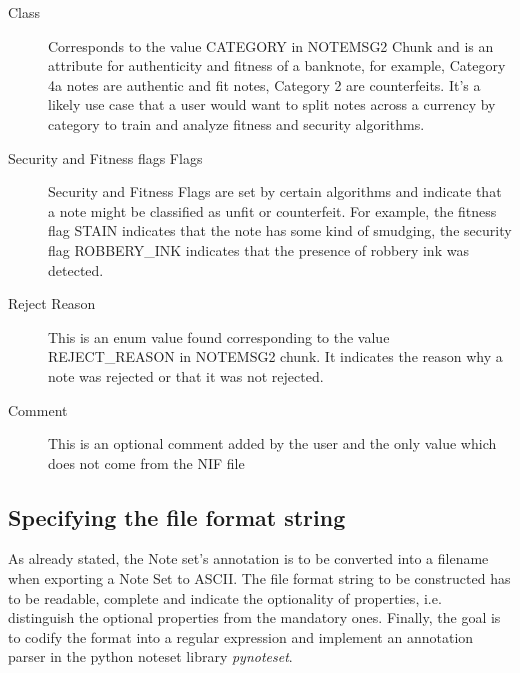 \begin{description}
\item[Class] Corresponds to the value CATEGORY in NOTEMSG2 Chunk and is an attribute for authenticity and fitness of a banknote, for example, Category 4a notes are authentic and fit notes, Category 2 are counterfeits. It's a likely use case that a user would want to split notes across a currency by category to train and analyze fitness and security algorithms. 
\item[Security and Fitness flags Flags] Security and Fitness Flags are set by certain algorithms and indicate that a note might be classified as unfit or counterfeit. For example, the fitness flag STAIN indicates that the note has some kind of smudging, the security flag ROBBERY\_INK indicates that the presence of robbery ink was detected. 
\item[Reject Reason] This is an enum value found corresponding to the value REJECT\_REASON in NOTEMSG2 chunk. It indicates the reason why a note was rejected or that it was not rejected.
\item [Comment] This is an optional comment added by the user and the only value which does not come from the NIF file
\end{description}

\subsection{Specifying the file format string}
As already stated, the Note set's annotation is to be converted into a filename when exporting a Note Set to ASCII. The file format string to be constructed has to be readable, complete and indicate the optionality of properties, i.e. distinguish the optional properties from the mandatory ones. Finally, the goal is to codify the format into a regular expression and implement an annotation parser in the python noteset library \emph{pynoteset}.
